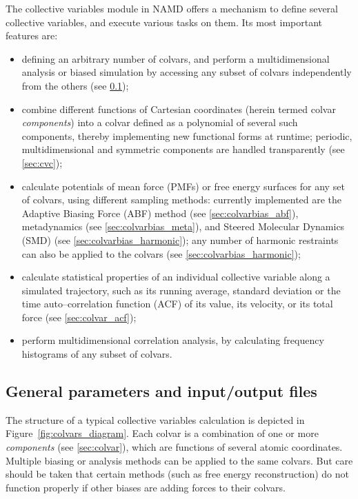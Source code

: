 The collective variables module in NAMD offers a mechanism to define
several collective variables, and execute various tasks on them.
Its most important features are:
\begin{itemize}

\item defining an arbitrary number of colvars, and perform a
  multidimensional analysis or biased simulation by accessing any
  subset of colvars independently from the others (see
  \ref{sec:colvarmodule});

\item combine different functions of Cartesian coordinates
  (herein termed colvar \emph{components}) into a colvar
  defined as a polynomial of several such components, thereby
  implementing new functional forms at runtime; periodic,
  multidimensional and symmetric components are handled transparently
  (see \ref{sec:cvc});

\item calculate potentials of mean force (PMFs) or free energy
  surfaces for any set of colvars, using different sampling methods:
  currently implemented are the Adaptive Biasing Force (ABF)
  method (see \ref{sec:colvarbias_abf}), metadynamics (see
  \ref{sec:colvarbias_meta}), and Steered Molecular Dynamics (SMD)
  (see \ref{sec:colvarbias_harmonic}); any number of harmonic
  restraints can also be applied to the colvars (see
  \ref{sec:colvarbias_harmonic});

\item calculate statistical properties of an individual collective
  variable along a simulated trajectory, such as its running average,
  standard deviation or the time auto--correlation function (ACF)
  of its value, its velocity, or its total force (see
  \ref{sec:colvar_acf});

\item perform multidimensional correlation analysis, by calculating
  frequency histograms of any subset of colvars.

\end{itemize}


\subsection{General parameters and input/output files}
\label{sec:colvarmodule}

The structure of a typical collective variables calculation is
depicted in Figure~\ref{fig:colvars_diagram}.  Each colvar is a
combination of one or more \emph{components} (see \ref{sec:colvar}),
which are functions of several atomic coordinates.  Multiple biasing
or analysis methods can be applied to the same colvars.  But care
should be taken that certain methods (such as free energy
reconstruction) do not function properly if other biases are adding
forces to their colvars.

